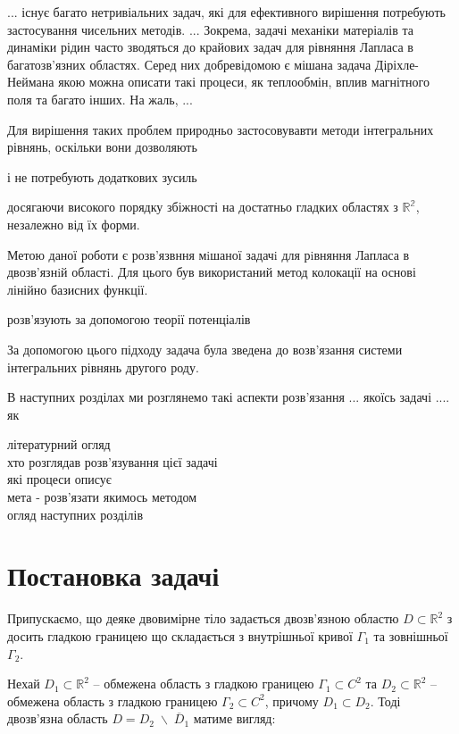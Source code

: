 \documentclass[14pt,a4paper]{extarticle}
\newcounter{e}
\numberwithin{equation}{section}
\numberwithin{figure}{section}
\begin{document}
 ... існує багато нетривіальних задач, які для ефективного вирішення потребують застосування чисельних методів.
 ...
 Зокрема, задачі механіки матеріалів та динаміки рідин часто зводяться до крайових задач для рівняння Лапласа в багатозв'язних областях. Серед них добревідомою є мішана задача Діріхле-Неймана якою можна описати такі процеси, як теплообмін, вплив магнітного поля та багато інших. На жаль, ...
  
 Для вирішення таких проблем природньо застосовувавти методи інтегральних рівнянь, оскільки вони дозволяють 
  
 і не потребують додаткових зусиль
  
 досягаючи високого порядку збіжності на достатньо гладких областях з $\mathbb{R^2}$, незалежно від їх форми.
  
  
 Метою даної роботи є розв'язвння мiшаної задачi для рiвняння Лапласа в двозв’язнiй областi. Для цього був використаний метод колокації на основі лінійно базисних функції.
  
 розв'язують за допомогою теорії потенціалів
  
 За допомогою цього підходу задача була зведена до возв'язання системи інтегральних рівнянь другого роду.
   
   
 В наступних розділах ми розглянемо такі аспекти розв'язання ... якоїсь задачі .... як
  
 
 
 
 літературний огляд \\
 хто розглядав розв'язування цієї задачі \\
 які процеси описує \\
 мета - розв'язати якимось методом \\
 огляд наступних розділів

 \newpage
 \thispagestyle{empty}
 \section{Постановка задачі}
		
	Припускаємо, що деяке двовимірне тіло задається двозв'язною областю $D \subset \mathbb{R}^2$ з досить гладкою границею що складається з внутрішньої кривої $\Gamma_1$ та зовнішньої $\Gamma_2$. 
	
	Нехай $D_1 \subset \mathbb{R}^2$ – обмежена область з гладкою границею $\Gamma_1 \subset C^2$ та $D_2 \subset \mathbb{R}^2$ – обмежена область з гладкою границею $\Gamma_2 \subset C^2$, причому $D_1\subset D_2$. Тоді двозв'язна область $D = D_2 \; \backslash \; \overline{D}_1$ матиме вигляд:
\end{document}
